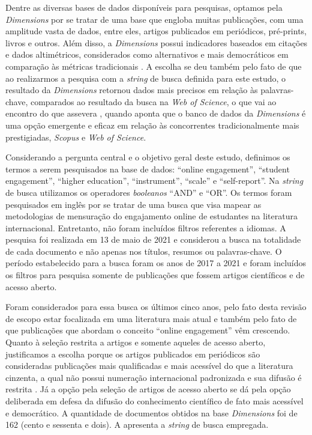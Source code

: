 \documentclass[portuguese]{textolivre}
\begin{document}
Dentre as diversas bases de dados disponíveis para pesquisas, optamos pela \emph{Dimensions} por se tratar de uma base que engloba muitas publicações, com uma amplitude vasta de dados, entre eles, artigos publicados em periódicos, pré-prints, livros e outros. Além disso, a \emph{Dimensions} possui indicadores baseados em citações e dados altimétricos, considerados como alternativos e mais democráticos em comparação às métricas tradicionais \cite{dimensions2021}. A escolha se deu também pelo fato de que ao realizarmos a pesquisa com a \emph{string} de busca definida para este estudo, o resultado da \emph{Dimensions} retornou dados mais precisos em relação às palavras-chave, comparados ao resultado da busca na \emph{Web of Science}, o que vai ao encontro do que assevera \textcite{thelwall2018}, quando aponta que o banco de dados da \emph{Dimensions} é uma opção emergente e eficaz em relação às concorrentes tradicionalmente mais prestigiadas, \emph{Scopus} e \emph{Web of Science}.

Considerando a pergunta central e o objetivo geral deste estudo, definimos os termos a serem pesquisados na base de dados: “online engagement”, “student engagement”, “higher education”, “instrument”, “scale” e “self-report”. Na \emph{string} de busca utilizamos os operadores \emph{booleanos} “AND” e “OR”. Os termos foram pesquisados em inglês por se tratar de uma busca que visa mapear as metodologias de mensuração do engajamento online de estudantes na literatura internacional. Entretanto, não foram incluídos filtros referentes a idiomas. A pesquisa foi realizada em 13 de maio de 2021 e considerou a busca na totalidade de cada documento e não apenas nos títulos, resumos ou palavras-chave. O período estabelecido para a busca foram os anos de 2017 a 2021 e foram incluídos os filtros para pesquisa somente de publicações que fossem artigos científicos e de acesso aberto.

Foram considerados para essa busca os últimos cinco anos, pelo fato desta revisão de escopo estar focalizada em uma literatura mais atual e também pelo fato de que publicações que abordam o conceito “online engagement” vêm crescendo. Quanto à seleção restrita a artigos e somente aqueles de acesso aberto, justificamos a escolha porque os artigos publicados em periódicos são consideradas publicações mais qualificadas e mais acessível do que a literatura cinzenta, a qual não possui numeração internacional padronizada e sua difusão é restrita \cite{botelho2002}. Já a opção pela seleção de artigos de acesso aberto se dá pela opção deliberada em defesa da difusão do conhecimento científico de fato mais acessível e democrático. A quantidade de documentos obtidos na base \emph{Dimensions} foi de 162 (cento e sessenta e dois). A  apresenta a \emph{string} de busca empregada.
\end{document}
